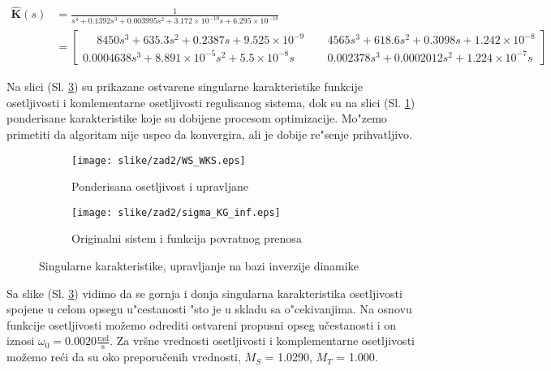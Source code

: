 \documentclass[a4paper,11pt]{article}
\theoremstyle{definition} \newtheorem{deff}{Definicija}[section]
\theoremstyle{definition} \newtheorem{prim}[deff]{Primer}
\theoremstyle{plain} \newtheorem{teor}[deff]{Teorema}
\begin{document}
			
			\begin{equation}
				\begin{split}
					\hat{\textbf{K}}(s) &= \frac{1}{s^4 + 0.1392 s^3 + 0.003995 s^2 + 3.172 \times 10^{-10} s + 6.295 \times 10^{-18}} \\
					&= \begin{bmatrix}
						\phantom{-}8450 s^3 + 635.3 s^2 + 0.2387 s + 9.525 \times 10^{-9}  & \phantom{-}4565 s^3 + 618.6 s^2 + 0.3098 s + 1.242 \times 10^{-8} \\
						0.0004638 s^3 + 8.891 \times 10^{-5} s^2 + 5.5 \times 10^{-8} s & \phantom{-}0.002378 s^3 + 0.0002012 s^2 + 1.224 \times 10^{-7} s 
					\end{bmatrix}
				\end{split}
			\end{equation}
			
			\clearpage
			
			Na slici (Sl. \ref{fig:sigma_KG_inf}) su prikazane ostvarene singularne karakteristike funkcije osetljivosti i komlementarne osetljivosti regulisanog sistema, dok su na slici (Sl. \ref{fig:WS_WKS}) ponderisane karakteristike koje su dobijene procesom optimizacije. Mo"zemo primetiti da algoritam nije uspeo da konvergira, ali je dobije re"senje prihvatljivo.
			
			\hspace{2cm}
			
			\begin{figure}[h]
				\centering
				\begin{subfigure}{0.59\linewidth}
					\centering
					\texttt{[image: slike/zad2/WS\_WKS.eps]}
					\caption{Ponderisana osetljivost i upravljane}
					\label{fig:WS_WKS}
				\end{subfigure}
				\hfill
				\begin{subfigure}{0.59\linewidth}
					\centering
					\texttt{[image: slike/zad2/sigma\_KG\_inf.eps]}
					\caption{Originalni sistem i funkcija povratnog prenosa}
					\label{fig:sigma_KG_inf}
				\end{subfigure}
				\caption{Singularne karakteristike, upravljanje na bazi inverzije dinamike}
			\end{figure}
			
			\hspace{2cm}
			
			Sa slike (Sl. \ref{fig:sigma_KG_inf}) vidimo da se gornja i donja singularna karakteristika osetljivosti spojene u celom opsegu u"cestanosti "sto je u skladu sa o"cekivanjima. Na osnovu funkcije osetljivosti možemo odrediti ostvareni propusni opseg učestanosti i on iznosi $\omega_0 = 0.0020 \frac{\text{rad}}{\text{s}}$. Za vršne vrednosti osetljivosti i komplementarne osetljivosti možemo reći da su oko preporučenih vrednosti, $M_S$ = 1.0290, $M_T$ = 1.000. 
			
\end{document}
